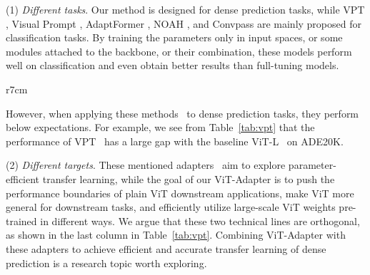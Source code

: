 \documentclass{article} \usepackage{iclr2023_conference,times}
\begin{document}
(1) \emph{Different tasks}. Our method is designed for dense prediction tasks, while VPT \citep{jia2022visual}, Visual Prompt \citep{bahng2022exploring}, AdaptFormer \citep{chen2022adaptformer}, NOAH \citep{zhang2022neural}, and Convpass \citep{jie2022convolutional} are mainly proposed for classification tasks. 
By training the parameters only in input spaces, or some modules attached to the backbone, or their combination, these models perform well on classification and even obtain better results than full-tuning models. 

\begin{wraptable}{r}{7cm}\small
\renewcommand\arraystretch{0.9}
\centering
\vspace{-1.3em}
{
}
\vspace{-0.5em}
\caption{\textbf{Comparison with VPT.}}
\vspace{-2em}
\label{tab:vpt}
\end{wraptable}
However, when applying these methods~\citep{jia2022visual,bahng2022exploring,chen2022adaptformer,zhang2022neural,jie2022convolutional} to dense prediction tasks, they perform below expectations. For example, we see from Table~\ref{tab:vpt} that the performance of VPT~\citep{jia2022visual} has a large gap with the baseline ViT-L~\citep{zheng2021rethinking} on ADE20K. 


(2) \emph{Different targets}. These mentioned adapters~\citep{jia2022visual,bahng2022exploring,chen2022adaptformer,zhang2022neural,jie2022convolutional} aim to explore parameter-efficient transfer learning, while the goal of our ViT-Adapter is to push the performance boundaries of plain ViT downstream applications, make ViT more general for downstream tasks, and efficiently utilize large-scale ViT weights pre-trained in different ways. 
We argue that these two technical lines are orthogonal, as shown in the last column in Table~\ref{tab:vpt}. Combining ViT-Adapter with these adapters to achieve efficient and accurate transfer learning of dense prediction is a research topic worth exploring.
\end{document}
